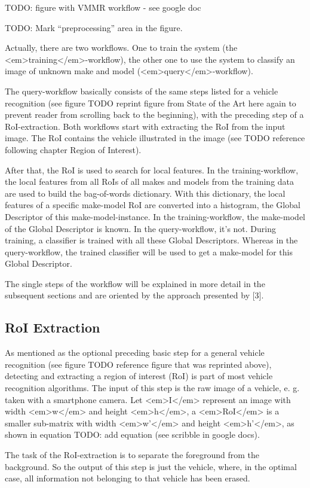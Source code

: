 TODO: figure with VMMR workflow - see google doc

TODO: Mark “preprocessing” area in the figure.

Actually, there are two workflows. One to train the system (the <em>training</em>-workflow), the other one to use the system to classify an image of unknown make and model (<em>query</em>-workflow).

The query-workflow basically consists of the same steps listed for a vehicle recognition (see figure TODO reprint figure from State of the Art here again to prevent reader from scrolling back to the beginning), with the preceding step of a RoI-extraction. Both workflows start with extracting the RoI from the input image. The RoI contains the vehicle illustrated in the image (see TODO reference following chapter Region of Interest).

After that, the RoI is used to search for local features. In the training-workflow, the local features from all RoIs of all makes and models from the training data are used to build the bag-of-words dictionary. With this dictionary, the local features of a specific make-model RoI are converted into a histogram, the Global Descriptor of this make-model-instance. In the training-workflow, the make-model of the Global Descriptor is known. In the query-workflow, it’s not.
During training, a classifier is trained with all these Global Descriptors. Whereas in the query-workflow, the trained classifier will be used to get a make-model for this Global Descriptor.

The single steps of the workflow will be explained in more detail in the subsequent sections and are oriented by the approach presented by [3].

\subsection{RoI Extraction}
As mentioned as the optional preceding basic step for a general vehicle recognition (see figure TODO reference figure that was reprinted above), detecting and extracting a region of interest (RoI) is part of most vehicle recognition algorithms. The input of this step is the raw image of a vehicle, e. g. taken with a smartphone camera.
Let <em>I</em> represent an image with width <em>w</em> and height <em>h</em>, a <em>RoI</em> is a smaller sub-matrix with width <em>w’</em> and height <em>h’</em>, as shown in equation TODO: add equation (see scribble in google docs).

The task of the RoI-extraction is to separate the foreground from the background. So the output of this step is just the vehicle, where, in the optimal case, all information not belonging to that vehicle has been erased.


